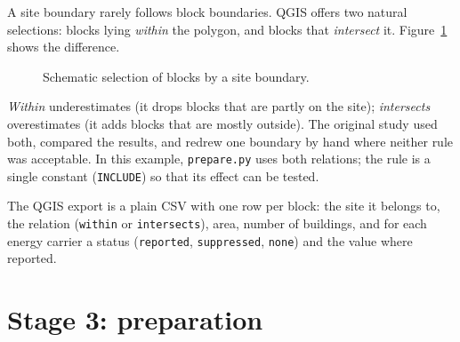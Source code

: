 \documentclass[11pt,a4paper]{article}
\begin{document}
A site boundary rarely follows block boundaries. QGIS offers two natural
selections: blocks lying \emph{within} the polygon, and blocks that
\emph{intersect} it. Figure~\ref{fig:selection} shows the difference.

\begin{figure}[ht]
\centering
{}
\caption{Schematic selection of blocks by a site boundary.}
\label{fig:selection}
\end{figure}

\emph{Within} underestimates (it drops blocks that are partly on the site);
\emph{intersects} overestimates (it adds blocks that are mostly outside).
The original study used both, compared the results, and redrew one boundary by
hand where neither rule was acceptable. In this example, \texttt{prepare.py}
uses both relations; the rule is a single constant (\texttt{INCLUDE}) so that
its effect can be tested.

The QGIS export is a plain CSV with one row per block: the site it belongs to,
the relation (\texttt{within} or \texttt{intersects}), area, number of
buildings, and for each energy carrier a status (\texttt{reported},
\texttt{suppressed}, \texttt{none}) and the value where reported.

\section{Stage 3: preparation}\label{sec:prepare}
\end{document}
